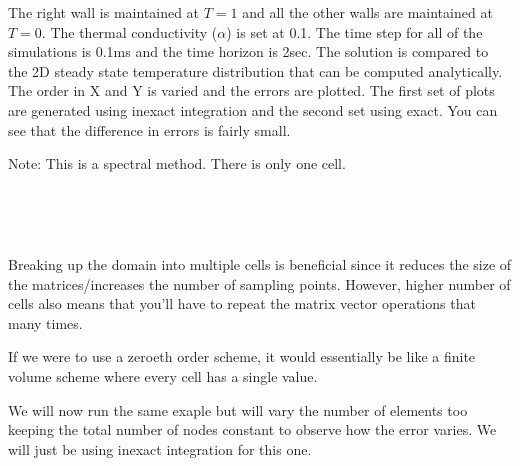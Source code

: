 \documentclass[11pt]{article}
\begin{document}
The right wall is maintained at \(T = 1\) and all the other walls are
maintained at \(T = 0\). The thermal conductivity (\(\alpha\)) is set at
0.1. The time step for all of the simulations is 0.1ms and the time
horizon is 2sec. The solution is compared to the 2D steady state
temperature distribution that can be computed analytically. The order in
X and Y is varied and the errors are plotted. The first set of plots are
generated using inexact integration and the second set using exact. You
can see that the difference in errors is fairly small.

Note: This is a spectral method. There is only one cell.


    \begin{center}
    \end{center}
    { \hspace*{\fill} \\}
    

    \begin{center}
    \end{center}
    { \hspace*{\fill} \\}
    
    Breaking up the domain into multiple cells is beneficial since it
reduces the size of the matrices/increases the number of sampling
points. However, higher number of cells also means that you'll have to
repeat the matrix vector operations that many times.

If we were to use a zeroeth order scheme, it would essentially be like a
finite volume scheme where every cell has a single value.

We will now run the same exaple but will vary the number of elements too
keeping the total number of nodes constant to observe how the error
varies. We will just be using inexact integration for this one.


    \begin{center}
    \end{center}
    { \hspace*{\fill} \\}
    
\end{document}
